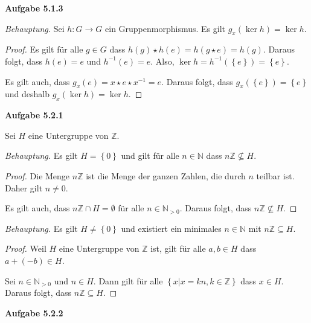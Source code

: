 \documentclass[12pt]{extarticle}
\begin{document}
\textbf{Aufgabe 5.1.3}

\vspace{3mm}
\textit{Behauptung.}  Sei \(h: G \rightarrow G\) ein Gruppenmorphismus.
Es gilt \(g_x(\ker h)=\ker h\).

\begin{proof}
  Es gilt für alle \(g \in G\) dass $h(g) \star h(e) = h(g \star e) =
  h(g)$.  Daraus folgt, dass \(h(e) = e\) und \(h^{-1}(e) = e\).  Also,
  \(\ker h = h^{-1}(\left\{ e \right\}) = \left\{ e \right\}\).

  Es gilt auch, dass \(g_x(e) = x \star e \star x^{-1} = e\).  Daraus
  folgt, dass \(g_x(\left\{ e \right\}) = \left\{ e \right\}\) und
  deshalb \(g_x(\ker h) = \ker h\).
\end{proof}

\textbf{Aufgabe 5.2.1}

Sei \(H\) eine Untergruppe von \(\mathbb{Z}\).

\vspace{3mm}
\textit{Behauptung.}  Es gilt \(H = \left\{ 0 \right\}\) und gilt
für alle \(n \in \mathbb{N}\) dass \(n\mathbb{Z} \nsubseteq H\).

\begin{proof}
  Die Menge \(n\mathbb{Z}\) ist die Menge der ganzen Zahlen, die durch
  \(n\) teilbar ist.  Daher gilt \(n \neq 0\).

  Es gilt auch, dass \(n\mathbb{Z} \cap H = \emptyset\) für alle $n \in
  \mathbb{N}_{>0}$.  Daraus folgt, dass \(n\mathbb{Z} \nsubseteq H\).
\end{proof}

\textit{Behauptung.}  Es gilt \(H \neq \left\{ 0 \right\}\) und existiert
ein minimales \(n \in \mathbb{N}\) mit \(n\mathbb{Z} \subseteq H\).

\begin{proof}
  Weil \(H\) eine Untergruppe von \(\mathbb{Z}\) ist, gilt für alle $a, b
  \in H$ dass \(a + (-b) \in H\).

  Sei \(n \in \mathbb{N}_{>0}\) und \(n \in H\).  Dann gilt für alle
  \(\left\{ x | x = kn, k \in \mathbb{Z} \right\}\) dass \(x \in H\).
  Daraus folgt, dass \(n\mathbb{Z} \subseteq H\).
\end{proof}

\textbf{Aufgabe 5.2.2}
\end{document}
